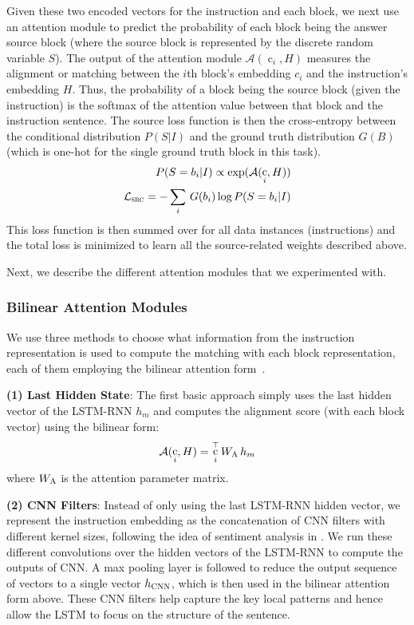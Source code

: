 \documentclass[letterpaper]{article} %
\DeclareMathOperator{\embb}{c}
\begin{document}
Given these two encoded vectors for the instruction and each block, we next use an attention module to predict the probability of each block being the answer source block (where the source block is represented by the discrete random variable $S$). 
The output of the attention module $\mathcal{A}(\embb_i, H)$ measures the alignment or matching between the $i$th block's embedding $c_i$ and the instruction's embedding $H$. 
Thus, the probability of a block being the source block (given the instruction) is the softmax of the attention value between that block and the instruction sentence.
%
The source loss function is then the cross-entropy between the conditional distribution $P(S|I)$ and the ground truth distribution $G(B)$ (which is one-hot for the single ground truth block in this task).
\begin{align}
P(S = b_i|I)  \propto \exp(\mathcal{A}(\embb_i, H))\\
\mathcal{L}_\textsc{src}  = -\sum_i\, G(b_i) \log P(S = b_i|I)
\end{align}
This loss function is then summed over for all data instances (instructions) and the total loss is minimized to learn all the source-related weights described above.

Next, we describe the different attention modules that we experimented with.

\subsubsection{Bilinear Attention Modules}
\label{sec:attn}
We use three methods to choose what information from the instruction representation is used to compute the matching with each block representation, each of them employing the bilinear attention form~\cite{luong2015effective}.

\textbf{(1) Last Hidden State}:
The first basic approach simply uses the last hidden vector of the LSTM-RNN $h_m$ and computes the alignment score (with each block vector) using the bilinear form:
\begin{equation}
\mathcal{A}(\embb_i, H) = \embb_i^{\top} W_{\textsc{A}} \, h_m
\end{equation}
where $W_{\textsc{A}}$ is the attention parameter matrix.


\textbf{(2) CNN Filters}:
Instead of only using the last LSTM-RNN hidden vector, we represent the instruction embedding as the concatenation of CNN filters with different kernel sizes, following the idea of sentiment analysis in \cite{kim2014convolutional}. 
We run these different convolutions over the hidden vectors of the LSTM-RNN to compute the outputs of CNN. A max pooling layer is followed to reduce the output sequence of vectors to a single vector $h_{\textsc{CNN}}$, which is then used in the bilinear attention form above.
These CNN filters help capture the key local patterns and hence allow the LSTM to focus on the structure of the sentence. 
\end{document}
